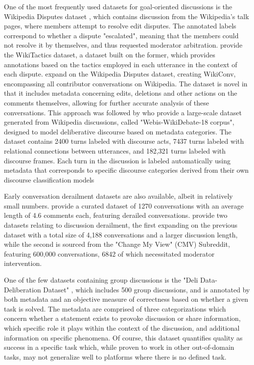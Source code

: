 One of the most frequently used datasets for goal-oriented discussions is the Wikipedia Disputes dataset \cite{de-kock-vlachos-2021-beg}, which contains discussion from the Wikipedia's talk pages, where members attempt to resolve edit disputes. The annotated labels correspond to whether a dispute "escalated", meaning that the members could not resolve it by themselves, and thus requested moderator arbitration. \citet{dekock2022disagree} provide the WikiTactics dataset, a dataset built on the former, which provides annotations based on the tactics employed in each utterance in the context of each dispute. \citet{hua2018wikiconvcorpuscompleteconversational} expand on the Wikipedia Disputes dataset, creating WikiConv, encompassing all contributor conversations on Wikipedia. The dataset is novel in that it includes metadata concerning edits, deletions and other actions on the comments themselves, allowing for further accurate analysis of these conversations. This approach was followed by \cite{al-khatib-etal-2018-modeling} who provide a large-scale dataset generated from Wikipedia discussions, called "Webis-WikiDebate-18 corpus", designed to model deliberative discourse based on metadata categories. The dataset contains 2400 turns labeled with discourse acts, 7437 turns labeled with relational connections between utterances, and 182,321 turns labeled with discourse frames. Each turn in the discussion is labeled automatically using metadata that corresponds to specific discourse categories derived from their own discourse classification models

Early conversation derailment datasets are also available, albeit in relatively small numbers. \cite{zhang-2018-gone-awry} provide a curated dataset of 1270 conversations with an average length of 4.6 comments each, featuring derailed conversations. \cite{chang-danescu-niculescu-mizil-2019-trouble} provide two datasets relating to discussion derailment, the first expanding on the previous dataset with a total size of 4,188 conversations and a larger discussion length, while the second is sourced from the "Change My View" (CMV) Subreddit, featuring 600,000 conversations, 6842 of which necessitated moderator intervention.

One of the few datasets containing group discussions is the "Deli Data-Deliberation Dataset" \cite{karadzhov2023delidata}, which includes 500 group discussions, and is annotated by both metadata and an objective measure of correctness based on whether a given task is solved. The metadata are comprised of three categorizations which concern whether a statement exists to provoke discussion or share information, which specific role it plays within the context of the discussion, and additional information on specific phenomena. Of course, this dataset quantifies quality as success in a specific task which, while proven to work in other out-of-domain tasks, may not generalize well to platforms where there is no defined task.


